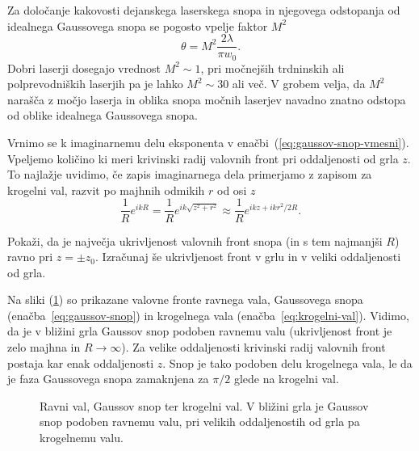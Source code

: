 \begin{remark}
Za določanje kakovosti dejanskega laserskega snopa 
in njegovega odstopanja od idealnega Gaussovega snopa se pogosto vpelje faktor $M^2$
\begin{equation}
\theta = M^2 \frac{2\lambda}{\pi w_{0}}.
\label{faktorM}
\end{equation}
Dobri laserji dosegajo vrednost $M^2 \sim 1$,
pri močnejših trdninskih ali polprevodniških laserjih pa je lahko $M^2 \sim 30$ ali več. 
V grobem velja, da $M^2$ narašča z močjo laserja in oblika snopa močnih laserjev navadno znatno
odstopa od oblike idealnega Gaussovega snopa.  
\end{remark}

Vrnimo se k imaginarnemu delu eksponenta v enačbi~(\ref{eq:gaussov-snop-vmesni}).
Vpeljemo količino 
ki meri krivinski radij valovnih front 
pri oddaljenosti od grla $z$. To najlažje
uvidimo, če zapis imaginarnega dela primerjamo z zapisom za krogelni val, razvit 
po majhnih odmikih $r$ od osi
$z$
\begin{equation}
\frac{1}{R}e^{ikR}=\frac{1}{R}e^{ik\sqrt{z^{2}+r^{2}}}\approx \frac{1}{R}e^{ikz+ikr^{2}/2R}.
\label{eq:krogelni-val}
\end{equation}

\begin{definition}
\label{naloga-ukrivljenost-snopa}
Pokaži, da je največja ukrivljenost valovnih front snopa (in s tem najmanjši $R$) ravno pri $z=\pm z_{0}$.
Izračunaj še ukrivljenost front v grlu in v veliki oddaljenosti od grla.
\end{definition}

Na sliki (\ref{fig:ravni-Gaussov-krogelni-val}) 
so prikazane valovne fronte ravnega vala, 
Gaussovega snopa (enačba~\ref{eq:gaussov-snop}) 
in krogelnega vala (enačba~\ref{eq:krogelni-val}). Vidimo, da je v bližini grla
Gaussov snop podoben ravnemu valu 
(ukrivljenost front je zelo majhna in $R \to \infty$). Za velike oddaljenosti
krivinski radij valovnih front postaja kar enak oddaljenosti $z$.
Snop je tako podoben delu krogelnega vala, le da je faza Gaussovega snopa 
zamaknjena za $\pi/2$ glede na krogelni val. 

\begin{figure}[h]
\centering
\def\svgwidth{90truemm} 

\caption{Ravni val, Gaussov snop ter
krogelni val. V bližini grla je Gaussov snop podoben ravnemu valu, 
pri velikih oddaljenostih od grla pa krogelnemu valu.}
\label{fig:ravni-Gaussov-krogelni-val}
\end{figure}

